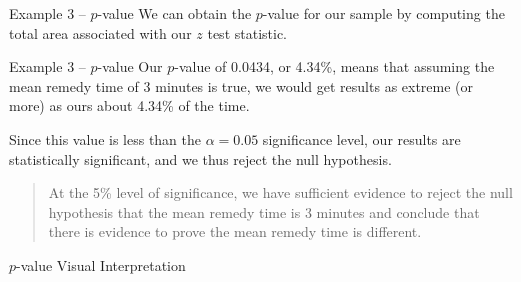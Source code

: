 \documentclass[t]{beamer}
\begin{document}
\begin{frame}{Example 3 -- $p$-value}
We can obtain the $p$-value for our sample by computing the total area associated with our $z$ test statistic.	\newline\\	\pause
\begin{center}
\end{center}
\end{frame}

\begin{frame}{Example 3 -- $p$-value}
Our $p$-value of 0.0434, or 4.34\%, means that assuming the mean remedy time of 3 minutes is true, we would get results as extreme (or more) as ours about 4.34\% of the time. 	\newline\\	\pause

Since this value is less than the $\alpha = 0.05$ significance level, our results are statistically significant, and we thus reject the null hypothesis.	\newline\\	\pause

\begin{quote}
At the 5\% level of significance, we have sufficient evidence to reject the null hypothesis that the mean remedy time is 3 minutes and conclude that there is evidence to prove the mean remedy time is different.
\end{quote}
\end{frame}

\begin{frame}{$p$-value Visual Interpretation}
\begin{center}
\end{center}
\end{frame}
\end{document}
